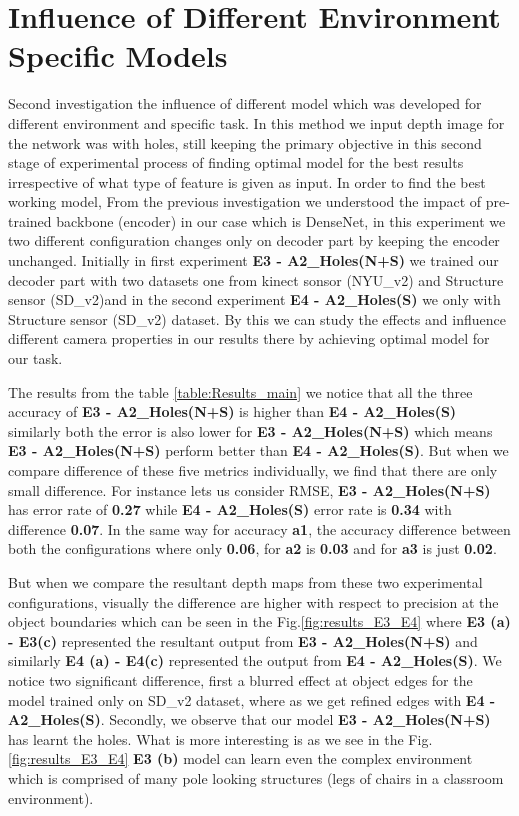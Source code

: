  

 \section{Influence of Different Environment Specific Models}
 \label{Chapter6:Transfer_Learning}
Second investigation the influence of different model which was developed for different environment and specific task. In this method we input depth image for the network was with holes, still keeping the primary objective in this second stage of experimental process of finding optimal model for the best results irrespective of what type of feature is given as input. In order to find the best working model, From the previous investigation we understood the impact of pre-trained backbone (encoder) in our case which is DenseNet, in this experiment we two different configuration changes only on decoder part by keeping the encoder unchanged. Initially in first experiment \textbf{E3 - A2\_Holes(N+S)}  we trained our decoder part with two datasets one from kinect sonsor (NYU\_v2) and Structure sensor (SD\_v2)and in the second experiment \textbf{E4 - A2\_Holes(S)} we only with Structure sensor (SD\_v2) dataset. By this we can study the effects and influence different camera properties in our results there by achieving optimal model for our task.

The results from the table \ref{table:Results_main} we notice that all the three accuracy of \textbf{E3 - A2\_Holes(N+S)} is higher than \textbf{E4 - A2\_Holes(S)} similarly both the error is also lower for \textbf{E3 - A2\_Holes(N+S)} which means \textbf{E3 - A2\_Holes(N+S)} perform better than  \textbf{E4 - A2\_Holes(S)}. But when we compare difference of these five metrics individually, we find that there are only small difference. For instance lets us consider RMSE, \textbf{E3 - A2\_Holes(N+S)} has error rate of \textbf{0.27} while \textbf{E4 - A2\_Holes(S)} error rate is \textbf{0.34} with difference \textbf{0.07}. In the same way for accuracy \textbf{a1}, the accuracy difference between both the configurations where only \textbf{0.06}, for \textbf{a2} is \textbf{0.03} and for \textbf{a3} is just \textbf{0.02}. 

But when we compare the resultant depth maps from these two experimental configurations, visually the difference are higher with respect to precision at the object boundaries which can be seen in the Fig.\ref{fig:results_E3_E4}  where \textbf{E3 (a) - E3(c)} represented the resultant output from \textbf{E3 - A2\_Holes(N+S)} and similarly  \textbf{E4 (a) - E4(c)} represented the output from \textbf{E4 - A2\_Holes(S)}. We notice two significant difference, first a blurred effect at object edges for the model trained only on SD\_v2 dataset, where as we get refined edges with \textbf{E4 - A2\_Holes(S)}. Secondly, we observe that our model \textbf{E3 - A2\_Holes(N+S)} has learnt the holes. What is more interesting is as we see in the Fig. \ref{fig:results_E3_E4} \textbf{E3 (b)} model can learn even the complex environment which is comprised of many pole looking structures (legs of chairs in a classroom environment).

